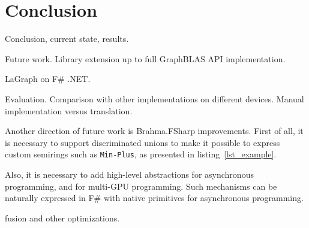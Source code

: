\section{Conclusion}

Conclusion, current state, results.

Future work. Library extension up to full GraphBLAS API implementation.

LaGraph on F\# .NET.

Evaluation. Comparison with other implementations on different devices.
Manual implementation versus translation.  

Another direction of future work is Brahma.FSharp improvements. 
First of all, it is necessary to support discriminated unions to make it possible to express custom semirings such as \texttt{Min-Plus}, as presented in listing~\ref{lst_example}. 

Also, it is necessary to add high-level abstractions for asynchronous programming, and for multi-GPU programming.
Such mechanisms can be naturally expressed in F\# with native primitives for asynchronous programming.

fusion and other optimizations.